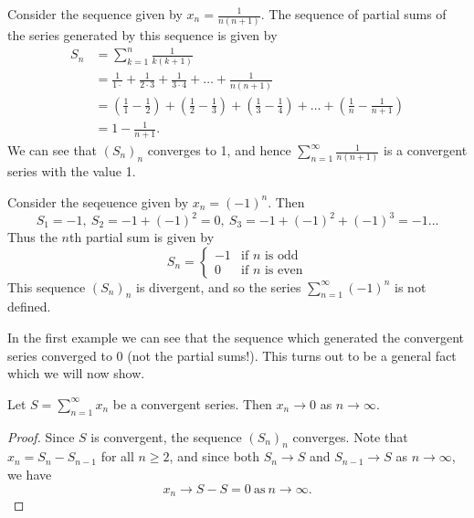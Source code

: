 \documentclass[../real_analysis.tex]{subfiles}
\begin{document}
        \begin{example}
            Consider the sequence given by $x_n=\frac{1}{n(n+1)}$. The sequence of partial sums of the series generated by this sequence is given by
            \begin{align}
                S_n&=\sum_{k=1}^n\frac{1}{k(k+1)}\\
                &=\frac{1}{1\cdot}+\frac{1}{2\cdot3}+\frac{1}{3\cdot4}+\dots+\frac{1}{n(n+1)}\\
                &=\left(\frac{1}{1}-\frac{1}{2}\right)+\left(\frac{1}{2}-\frac{1}{3}\right)+\left(\frac{1}{3}-\frac{1}{4}\right)+\dots+\left(\frac{1}{n}-\frac{1}{n+1}\right)\\
                &=1-\frac{1}{n+1}.
            \end{align}
            We can see that $(S_n)_n$ converges to 1, and hence $\sum_{n=1}^\infty\frac{1}{n(n+1)}$ is a convergent series with the value 1.
        \end{example}
        \begin{example}
            Consider the seqeuence given by $x_n=(-1)^n$. Then
            \begin{equation}
                S_1=-1,\ S_2=-1+(-1)^2=0,\ S_3=-1+(-1)^2+(-1)^3=-1\dots
            \end{equation}
            Thus the $n$th partial sum is given by
            \begin{equation}
                S_n=\begin{cases}
                    -1 & \text{if $n$ is odd}\\
                    0 & \text{if $n$ is even}
                \end{cases}
            \end{equation}
            This sequence $(S_n)_n$ is divergent, and so the series $\sum_{n=1}^\infty(-1)^n$ is not defined.
        \end{example}
        In the first example we can see that the sequence which generated the convergent series converged to 0 (not the partial sums!). This turns out to be a general fact which we will now show.
        \begin{theorem}\label{seq-of-series-to-0}
            Let $S=\sum_{n=1}^\infty x_n$ be a convergent series. Then $x_n\to0$ as $n\to\infty$.
        \end{theorem}
        \begin{proof}
            Since $S$ is convergent, the sequence $(S_n)_n$ converges. Note that $x_n=S_n-S_{n-1}$ for all $n\geq2$, and since both $S_n\to S$ and $S_{n-1}\to S$ as $n\to\infty$, we have
            \begin{equation}
                x_n\to S-S=0\ \text{as}\ n\to\infty.
            \end{equation}
        \end{proof}
\end{document}
